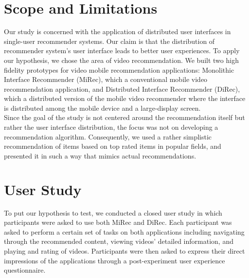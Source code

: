 \section{Scope and Limitations}
Our study is concerned with the application of distributed user interfaces in
single-user recommender systems. Our claim is that the distribution of
recommender system's user interface leads to better user experiences. To apply
our hypothesis, we chose the area of video recommendation. We built two high
fidelity prototypes for video mobile recommendation applications: Monolithic Interface Recommender (MiRec), which a conventional mobile video recommendation
application, and Distributed Interface Recommender (DiRec), which a distributed
version of the mobile video recommender where the interface is distributed among
the mobile device and a large-display screen.\\
Since the goal of the study is not centered around the recommendation itself but
rather the user interface distribution, the focus was not on developing a
recommendation algorithm. Consequently, we used a rather simplistic
recommendation of items based on top rated items in popular fields, and
presented it in such a way that mimics actual recommendations.

\section{User Study}
To put our hypothesis to test, we conducted a closed user study in which
participants were asked to use both MiRec and DiRec. Each
participant was asked to perform a certain set of tasks on both applications
including navigating through the recommended content, viewing videos' detailed
information, and playing and rating of videos. Participants were then asked to
express their direct impressions of the applications through a post-experiment
user experience questionnaire.

